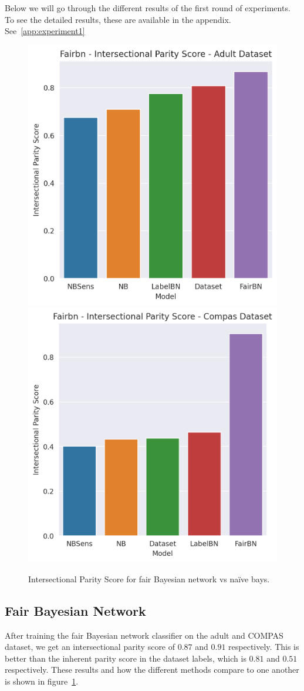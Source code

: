 \label{sec:result:experiment1}

Below we will go through the different results of the first round of experiments. To see the detailed results, these are available in the appendix. See~\ref{app:experiment1}

\begin{figure}
    \centering
    \includegraphics[width=0.49\linewidth]{figures/adult_fairbn_parity.png}
    \includegraphics[width=0.49\linewidth]{figures/compas_fairbn_parity.png}
    \caption{Intersectional Parity Score for fair Bayesian network vs naïve bays.}
    \label{fig:exp1fairBNparity}
\end{figure}

\subsection{Fair Bayesian Network}

After training the fair Bayesian network classifier on the adult and COMPAS dataset, we get an intersectional parity score of $0.87$ and $0.91$ respectively. This is better than the inherent parity score in the dataset labels, which is $0.81$ and $0.51$ respectively. These results and how the different methods compare to one another is shown in figure~\ref{fig:exp1fairBNparity}.

